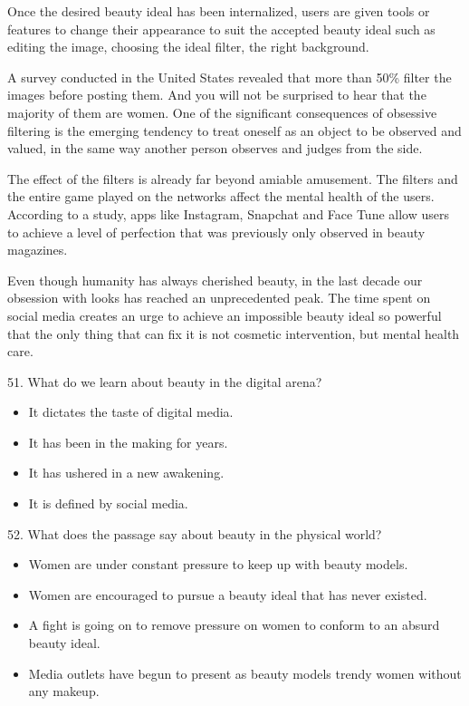 \documentclass[UTF8,11pt]{ctexart}
\begin{document}
Once the desired beauty ideal has been internalized, users are given tools or features to change their appearance to suit the accepted beauty ideal such as editing the image, choosing the ideal filter, the right background.


A survey conducted in the United States revealed that more than 50\% filter the images before posting them. And you will not be surprised to hear that the majority of them are women. One of the significant consequences of obsessive filtering is the emerging tendency to treat oneself as an object to be observed and valued, in the same way another person observes and judges from the side.


The effect of the filters is already far beyond amiable amusement. The filters and the entire game played on the networks affect the mental health of the users. According to a study, apps like Instagram, Snapchat and Face Tune allow users to achieve a level of perfection that was previously only observed in beauty magazines.


Even though humanity has always cherished beauty, in the last decade our obsession with looks has reached an unprecedented peak. The time spent on social media creates an urge to achieve an impossible beauty ideal so powerful that the only thing that can fix it is not cosmetic intervention, but mental health care.


51. What do we learn about beauty in the digital arena?


\begin{itemize}[leftmargin=2em,itemsep=.2em,topsep=.4em]\item[A.] It dictates the taste of digital media.
\item[B.] It has been in the making for years.
\item[C.] It has ushered in a new awakening.
\item[D.] It is defined by social media.
\end{itemize}

52. What does the passage say about beauty in the physical world?


\begin{itemize}[leftmargin=2em,itemsep=.2em,topsep=.4em]\item[A.] Women are under constant pressure to keep up with beauty models.
\item[B.] Women are encouraged to pursue a beauty ideal that has never existed.
\item[C.] A fight is going on to remove pressure on women to conform to an absurd beauty ideal.
\item[D.] Media outlets have begun to present as beauty models trendy women without any makeup.
\end{itemize}
\end{document}
